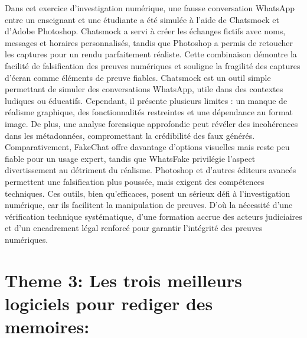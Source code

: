 \documentclass[12pt]{article}
\begin{document}
Dans cet exercice d’investigation numérique, une fausse conversation WhatsApp entre un enseignant et une étudiante a été simulée à l’aide de Chatsmock et d’Adobe Photoshop. Chatsmock a servi à créer les échanges fictifs avec noms, messages et horaires personnalisés, tandis que Photoshop a permis de retoucher les captures pour un rendu parfaitement réaliste. Cette combinaison démontre la facilité de falsification des preuves numériques et souligne la fragilité des captures d’écran comme éléments de preuve fiables. Chatsmock est un outil simple permettant de simuler des conversations WhatsApp, utile dans des contextes ludiques ou éducatifs. Cependant, il présente plusieurs limites : un manque de réalisme graphique, des fonctionnalités restreintes et une dépendance au format image. De plus, une analyse forensique approfondie peut révéler des incohérences dans les métadonnées, compromettant la crédibilité des faux générés. Comparativement, FakeChat offre davantage d’options visuelles mais reste peu fiable pour un usage expert, tandis que WhatsFake privilégie l’aspect divertissement au détriment du réalisme. Photoshop et d’autres éditeurs avancés permettent une falsification plus poussée, mais exigent des compétences techniques. Ces outils, bien qu’efficaces, posent un sérieux défi à l’investigation numérique, car ils facilitent la manipulation de preuves. D’où la nécessité d’une vérification technique systématique, d’une formation accrue des acteurs judiciaires et d’un encadrement légal renforcé pour garantir l’intégrité des preuves numériques.

\section{Theme 3: Les trois meilleurs logiciels pour rediger des memoires: }
\end{document}
